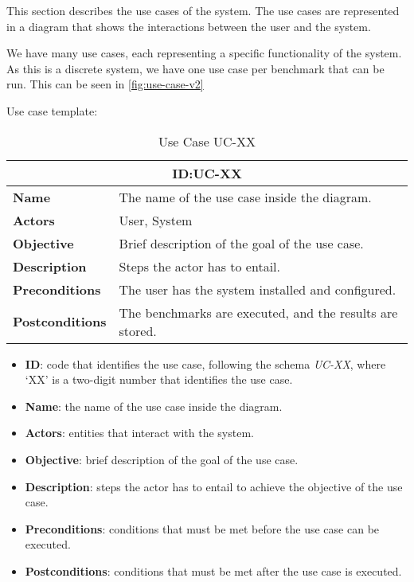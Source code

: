This section describes the use cases of the system. The use cases are represented in a diagram that shows the interactions between the user and the system. 

We have many use cases, each representing a specific functionality of the system. As this is a discrete system, we have one use case per benchmark that can be run. This can be seen in \autoref{fig:use-case-v2}



Use case template:

\begin{table}[H]
    \centering
    \begin{tabular}{l p{10cm}}
        \toprule
        \multicolumn{2}{c}{\textbf{ID:\@ UC-XX}} \\
        \toprule
        \textbf{Name}               &  The name of the use case inside the diagram. \\
        \textbf{Actors}             &  User, System \\
        \textbf{Objective}          &  Brief description of the goal of the use case. \\
        \textbf{Description}        &  Steps the actor has to entail. \\
        \textbf{Preconditions}      &  The user has the system installed and configured. \\
        \textbf{Postconditions}     &  The benchmarks are executed, and the results are stored. \\
    \end{tabular}
    \caption{Use Case UC-XX}\label{tab:uc-xx}
\end{table}

\begin{itemize}
    \item \textbf{ID}: code that identifies the use case, following the schema \textit{UC-XX}, where `XX' is a two-digit number that identifies the use case.
    \item \textbf{Name}: the name of the use case inside the diagram.
    \item \textbf{Actors}: entities that interact with the system.
    \item \textbf{Objective}: brief description of the goal of the use case.
    \item \textbf{Description}: steps the actor has to entail to achieve the objective of the use case.
    \item \textbf{Preconditions}: conditions that must be met before the use case can be executed.
    \item \textbf{Postconditions}: conditions that must be met after the use case is executed.
\end{itemize}


